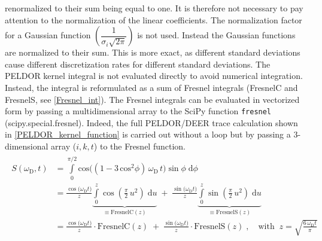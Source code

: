 \documentclass[pdftex,bezier,german,a4,twoside, headexclude,12pt,nochapterprefix, titlepage]{extarticle}
\begin{document}
renormalized to their sum being equal to one. It is therefore not necessary to pay attention to the normalization of the linear coefficients.
The normalization factor for a Gaussian function
$\left(\dfrac{1}{\sigma_i \sqrt{2\pi}}\right)$ is not used. Instead the Gaussian functions are normalized to their sum. This is more exact, as 
different standard deviations cause different discretization rates for different standard deviations. The PELDOR kernel integral is
not evaluated directly to avoid numerical integration. Instead, the integral is reformulated as a sum of Fresnel integrals (FresnelC and FresnelS, see \autoref{Fresnel_int}). The Fresnel integrals can be evaluated in vectorized form by passing a multidimensional array to the SciPy function
\texttt{fresnel} (scipy.special.fresnel). Indeed, the full PELDOR/DEER trace calculation shown in \autoref{PELDOR_kernel_function}
is carried out without a loop but by passing a 3-dimensional array ($i,k,t$) to the Fresnel function.
\begin{eqnarray}
\begin{split}
S(\omega_{\text{D}},t) & = \int\limits_{0}^{\pi/2}\mathrm{cos}\Big((1-3\,\mathrm{cos}^2\phi)\,\omega_{\text{D}}\,t\Big)\sin \phi\; \text{d}\phi \\ 
   & = 
   \frac{\cos{\big(\omega_{\text{D}}t \big)}}{z} 
   \underbrace{\int\limits_{0}^{z} \cos{\left( \frac{\pi}{2}\,u^{2} \right)} 
   \;\text{d}u}_{\equiv \text{FresnelC}(z)} \; + \; 
   \frac{\sin{\big(\omega_{\text{D}} t \big)}}{z}
   \underbrace{\int\limits_{0}^{z} 
   \sin{\left( \frac{\pi}{2}\,u^{2} \right)}\;\text{d}u}_{\equiv \text{FresnelS}(z)}      
\label{eqFresnel08} \\[2mm]
   & =  \frac{\cos{\big(\omega_{\text{D}}t \big)}}{z} \cdot \text{FresnelC}(z) \; + \;
   \frac{\sin{\big(\omega_{\text{D}} t\big)}}{z} \cdot \text{FresnelS}(z)\; ,
   \quad\text{with}\;\; z = \sqrt{\frac{6\,\omega_{\text{D}} t }{\pi}}
\label{eqFresnel09}  
\end{split}
\label{Fresnel_int}
\end{eqnarray}
\end{document}
